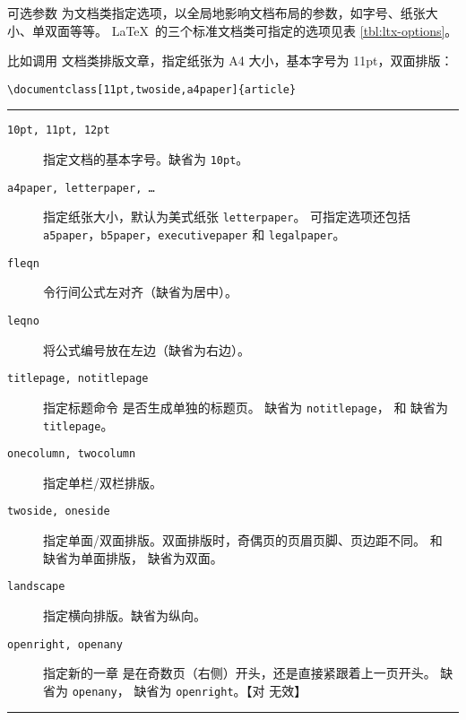 可选参数  为文档类指定选项，以全局地影响文档布局的参数，如字号、纸张大小、单双面等等。
\LaTeX\ 的三个标准文档类可指定的选项见表 \ref{tbl:ltx-options}。

比如调用  文档类排版文章，指定纸张为 A4 大小，基本字号为 11pt，双面排版：
\begin{verbatim}
\documentclass[11pt,twoside,a4paper]{article}
\end{verbatim}

\begin{table}[htp]
\caption{\LaTeX\ 的三个标准文档类可指定的选项}\label{tbl:ltx-options}
\hrule
\begin{description}
\item[\texttt{10pt, 11pt, 12pt}] \quad 指定文档的基本字号。缺省为 \texttt{10pt}。

\item[\texttt{a4paper, letterpaper, \ldots}] \quad 指定纸张大小，默认为美式纸张 \texttt{letterpaper}。
可指定选项还包括 \texttt{a5paper}，\texttt{b5paper}，\texttt{executivepaper} 和 \texttt{legalpaper}。

\item[\texttt{fleqn}] \quad 令行间公式左对齐（缺省为居中）。

\item[\texttt{leqno}] \quad 将公式编号放在左边（缺省为右边）。

\item[\texttt{titlepage, notitlepage}] 指定标题命令  是否生成单独的标题页。
 缺省为 \texttt{notitlepage}， 和  缺省为 \texttt{titlepage}。

\item[\texttt{onecolumn, twocolumn}] \quad 指定单栏/双栏排版。

\item[\texttt{twoside, oneside}] \quad 指定单面/双面排版。双面排版时，奇偶页的页眉页脚、页边距不同。
 和  缺省为单面排版， 缺省为双面。

\item[\texttt{landscape}] \quad 指定横向排版。缺省为纵向。

\item[\texttt{openright, openany}] \quad 指定新的一章  是在奇数页（右侧）开头，还是直接紧跟着上一页开头。
 缺省为 \texttt{openany}， 缺省为 \texttt{openright}。【对  无效】
\end{description}
\hrule
\end{table}

